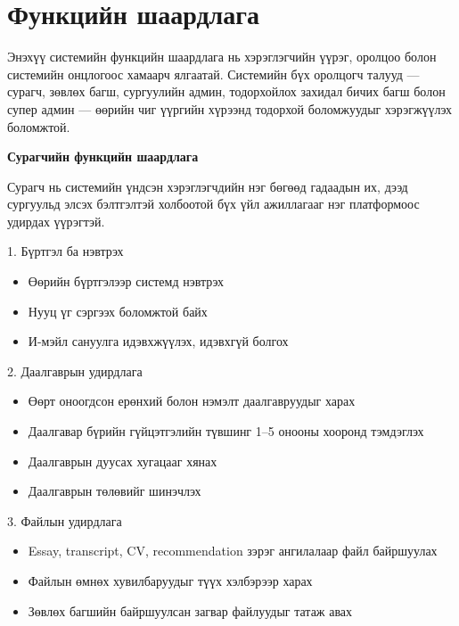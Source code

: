      


\section{Функцийн шаардлага}

Энэхүү системийн функцийн шаардлага нь хэрэглэгчийн үүрэг,
оролцоо болон системийн онцлогоос хамаарч ялгаатай. Системийн
бүх оролцогч талууд --- сурагч, зөвлөх багш, сургуулийн админ,
тодорхойлох захидал бичих багш болон супер админ --- өөрийн
чиг үүргийн хүрээнд тодорхой боломжуудыг хэрэгжүүлэх боломжтой.

\textbf{Сурагчийн функцийн шаардлага}

Сурагч нь системийн үндсэн хэрэглэгчдийн нэг бөгөөд гадаадын
их, дээд сургуульд элсэх бэлтгэлтэй холбоотой бүх үйл
ажиллагааг нэг платформоос удирдах үүрэгтэй.

1. Бүртгэл ба нэвтрэх
\begin{itemize}
    \item Өөрийн бүртгэлээр системд нэвтрэх
    \item Нууц үг сэргээх боломжтой байх
    \item И-мэйл сануулга идэвхжүүлэх, идэвхгүй болгох
\end{itemize}

2. Даалгаврын удирдлага
\begin{itemize}
    \item Өөрт оноогдсон ерөнхий болон нэмэлт даалгавруудыг харах
    \item Даалгавар бүрийн гүйцэтгэлийн түвшинг 1--5 онооны
    хооронд тэмдэглэх
    \item Даалгаврын дуусах хугацааг хянах
    \item Даалгаврын төлөвийг шинэчлэх
\end{itemize}

3. Файлын удирдлага
\begin{itemize}
    \item Essay, transcript, CV, recommendation зэрэг ангилалаар
    файл байршуулах
    \item Файлын өмнөх хувилбаруудыг түүх хэлбэрээр харах
    \item Зөвлөх багшийн байршуулсан загвар файлуудыг татаж авах
\end{itemize}

